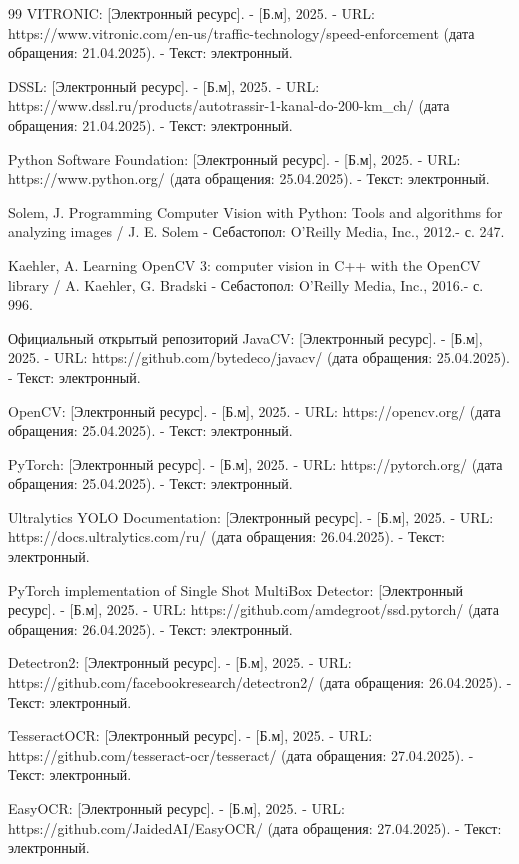 \documentclass[a4paper,12pt]{article}
\begin{document}
\begin{thebibliography}{99}
VITRONIC: [Электронный ресурс]. - [Б.м], 2025. - URL: https://www.vitronic.com/en-us/traffic-technology/speed-enforcement (дата обращения: 21.04.2025). - Текст: электронный.

DSSL: [Электронный ресурс]. - [Б.м], 2025. - URL: https://www.dssl.ru/products/autotrassir-1-kanal-do-200-km\_ch/ (дата обращения: 21.04.2025). - Текст: электронный.

Python Software Foundation: [Электронный ресурс]. - [Б.м], 2025. - URL: https://www.python.org/ (дата обращения: 25.04.2025). - Текст: электронный.

Solem, J. Programming Computer Vision with Python: Tools and algorithms for analyzing images / J. E. Solem - Себастопол: O'Reilly Media, Inc., 2012.- с. 247.

Kaehler, A. Learning OpenCV 3: computer vision in C++ with the OpenCV library / A. Kaehler, G. Bradski - Себастопол: O'Reilly Media, Inc., 2016.- с. 996.

Официальный открытый репозиторий JavaCV: [Электронный ресурс]. - [Б.м], 2025. - URL: https://github.com/bytedeco/javacv/ (дата обращения: 25.04.2025). - Текст: электронный.

OpenCV: [Электронный ресурс]. - [Б.м], 2025. - URL: https://opencv.org/ (дата обращения: 25.04.2025). - Текст: электронный.

PyTorch: [Электронный ресурс]. - [Б.м], 2025. - URL: https://pytorch.org/ (дата обращения: 25.04.2025). - Текст: электронный.

Ultralytics YOLO Documentation: [Электронный ресурс]. - [Б.м], 2025. - URL: https://docs.ultralytics.com/ru/ (дата обращения: 26.04.2025). - Текст: электронный.

PyTorch implementation of Single Shot MultiBox Detector: [Электронный ресурс]. - [Б.м], 2025. - URL: https://github.com/amdegroot/ssd.pytorch/ (дата обращения: 26.04.2025). - Текст: электронный.

Detectron2: [Электронный ресурс]. - [Б.м], 2025. - URL: https://github.com/facebookresearch/detectron2/ (дата обращения: 26.04.2025). - Текст: электронный.

TesseractOCR: [Электронный ресурс]. - [Б.м], 2025. - URL: https://github.com/tesseract-ocr/tesseract/ (дата обращения: 27.04.2025). - Текст: электронный.

EasyOCR: [Электронный ресурс]. - [Б.м], 2025. - URL: https://github.com/JaidedAI/EasyOCR/ (дата обращения: 27.04.2025). - Текст: электронный.


\end{thebibliography}
\end{document}
